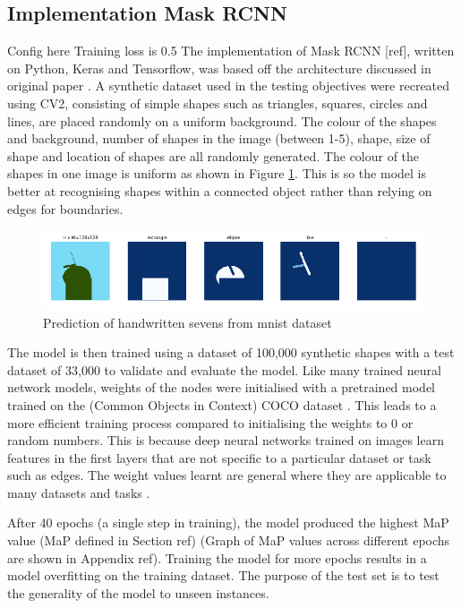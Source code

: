 \subsection{Implementation Mask RCNN}
Config here 
Training loss is 0.5
The implementation of Mask RCNN [ref], written on Python, Keras and Tensorflow, was based off the architecture discussed in original paper \cite{he2017mask}. A synthetic dataset used in the testing objectives were recreated using CV2, consisting of simple shapes such as triangles, squares, circles and lines, are placed randomly on a uniform background. The colour of the shapes and background, number of shapes in the image (between 1-5), shape, size of shape and location of shapes are all randomly generated. The colour of the shapes in one image is uniform as shown in Figure \ref{fig:dataset_ex}. This is so the model is better at recognising shapes within a connected object rather than relying on edges for boundaries. 
\begin{figure}[H]
	\begin{center}
		\includegraphics[width=160mm, scale=1]{maskrcnn_train.png}
		\caption{Prediction of handwritten sevens from mnist dataset}
		\label{fig:dataset_ex}
	\end{center}
	
\end{figure}

The model is then trained using a dataset of 100,000 synthetic shapes with a test dataset of 33,000 to validate and evaluate the model. Like many trained neural network models, weights of the nodes were initialised with a pretrained model trained on the (Common Objects in Context) COCO dataset \cite{lin2014microsoft}. This leads to a more efficient training process compared to initialising the weights to 0 or random numbers. This is because deep neural networks trained on images learn features in the first layers that are not specific to a particular dataset or task such as edges. The weight values learnt are general where they are applicable to many datasets and tasks \cite{yosinski2014transferable}.

After 40 epochs (a single step in training), the model produced the highest MaP value (MaP defined in Section ref) (Graph of MaP values across different epochs are shown in Appendix ref). Training the model for more epochs results in a model overfitting on the training dataset. The purpose of the test set is to test the generality of the model to unseen instances.
 
